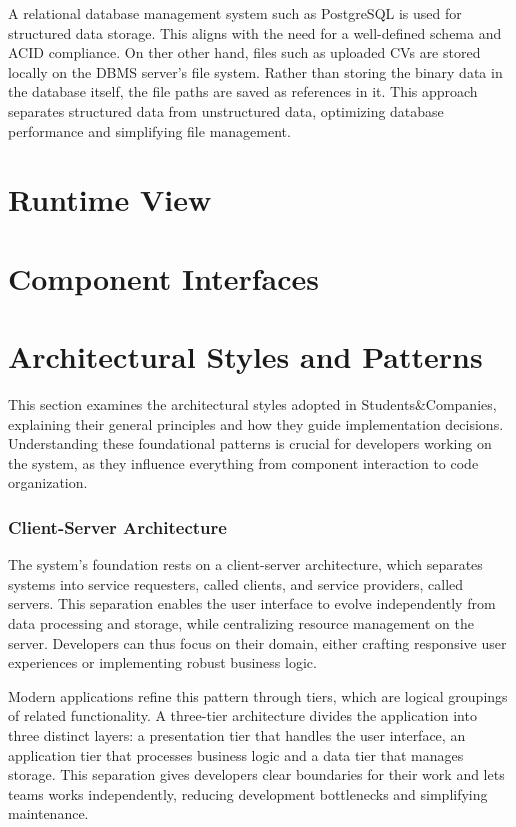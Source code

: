 A relational database management system such as PostgreSQL is used for structured data storage.
This aligns with the need for a well-defined schema and ACID compliance.
On ther other hand, files such as uploaded CVs are stored locally on the DBMS server’s file system.
Rather than storing the binary data in the database itself, the file paths are saved as references in it.
This approach separates structured data from unstructured data, optimizing database performance and simplifying file management.

\section{Runtime View}
\section{Component Interfaces}
\section{Architectural Styles and Patterns}
This section examines the architectural styles adopted in Students\&Companies, explaining their general principles and how they guide implementation decisions.
Understanding these foundational patterns is crucial for developers working on the system, as they influence everything from component interaction to code organization.

\subsubsection{Client-Server Architecture}
The system's foundation rests on a client-server architecture, which separates systems into service requesters, called clients, and service providers, called servers.
This separation enables the user interface to evolve independently from data processing and storage, while centralizing resource management on the server.
Developers can thus focus on their domain, either crafting responsive user experiences or implementing robust business logic.

Modern applications refine this pattern through tiers, which are logical groupings of related functionality.
A three-tier architecture divides the application into three distinct layers: a presentation tier that handles the user interface, an application tier that processes business logic and a data tier that manages storage.
This separation gives developers clear boundaries for their work and lets teams works independently, reducing development bottlenecks and simplifying maintenance.

